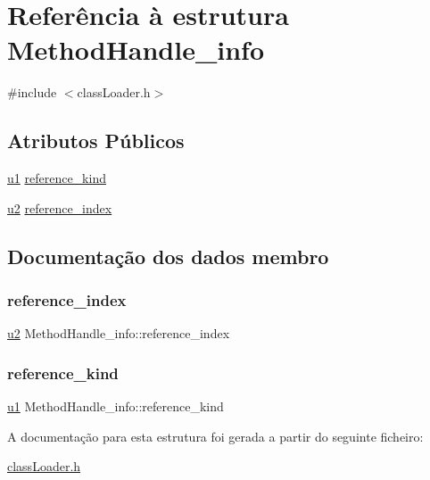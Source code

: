 \hypertarget{struct_method_handle__info}{}\section{Referência à estrutura Method\+Handle\+\_\+info}
\label{struct_method_handle__info}


{\ttfamily \#include $<$class\+Loader.\+h$>$}

\subsection*{Atributos Públicos}
\begin{DoxyCompactItemize}
\item 
\hyperlink{util_8h_a64f8055b64cf2a4c299c841130c5c938}{u1} \hyperlink{struct_method_handle__info_a29aea0e49b925f377bb39e0e82a1660f}{reference\+\_\+kind}
\item 
\hyperlink{util_8h_a55ef8d87fd202b8417704c089899c5b9}{u2} \hyperlink{struct_method_handle__info_a0dcd05766ea97f658efd9ee8c374aec1}{reference\+\_\+index}
\end{DoxyCompactItemize}


\subsection{Documentação dos dados membro}
\mbox{\label{struct_method_handle__info_a0dcd05766ea97f658efd9ee8c374aec1}} 
\subsubsection{\texorpdfstring{reference\+\_\+index}{reference\_index}}
{\footnotesize\ttfamily \hyperlink{util_8h_a55ef8d87fd202b8417704c089899c5b9}{u2} Method\+Handle\+\_\+info\+::reference\+\_\+index}

\mbox{\label{struct_method_handle__info_a29aea0e49b925f377bb39e0e82a1660f}} 
\subsubsection{\texorpdfstring{reference\+\_\+kind}{reference\_kind}}
{\footnotesize\ttfamily \hyperlink{util_8h_a64f8055b64cf2a4c299c841130c5c938}{u1} Method\+Handle\+\_\+info\+::reference\+\_\+kind}



A documentação para esta estrutura foi gerada a partir do seguinte ficheiro\+:\begin{DoxyCompactItemize}
\item 
\hyperlink{class_loader_8h}{class\+Loader.\+h}\end{DoxyCompactItemize}
